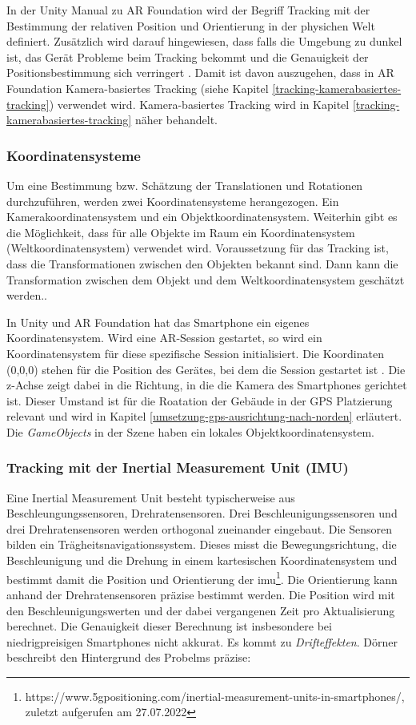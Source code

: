 In der Unity Manual zu AR Foundation wird der Begriff Tracking mit der Bestimmung der relativen Position und Orientierung in der physichen Welt definiert. Zusätzlich wird darauf hingewiesen, dass falls die Umgebung zu dunkel ist, das Gerät Probleme beim Tracking bekommt und die Genauigkeit der Positionsbestimmung sich verringert \cite{UnityARFoundation}. Damit ist davon auszugehen, dass in AR Foundation Kamera-basiertes Tracking (siehe Kapitel \ref*{tracking-kamerabasiertes-tracking}) verwendet wird. Kamera-basiertes Tracking wird in Kapitel \ref*{tracking-kamerabasiertes-tracking} näher behandelt.

\subsubsection{Koordinatensysteme}
\label{tracking-koordinatensysteme}
Um eine Bestimmung bzw. Schätzung der Translationen und Rotationen durchzuführen, werden zwei Koordinatensysteme herangezogen. Ein Kamerakoordinatensystem und ein Objektkoordinatensystem. Weiterhin gibt es die Möglichkeit, dass für alle Objekte im Raum ein Koordinatensystem (Weltkoordinatensystem) verwendet wird. Voraussetzung für das Tracking ist, dass die Transformationen zwischen den Objekten bekannt sind. Dann kann die Transformation zwischen dem Objekt und dem Weltkoordinatensystem geschätzt werden.\cite*[Dörner (2019) S.124f.,][]{doerner}.

In Unity und AR Foundation hat das Smartphone ein eigenes Koordinatensystem. Wird eine AR-Session gestartet, so wird ein Koordinatensystem für diese spezifische Session initialisiert. Die Koordinaten (0,0,0) stehen für die Position des Gerätes, bei dem die Session gestartet ist \cite{UnityARFoundation}. Die z-Achse zeigt dabei in die Richtung, in die die Kamera des Smartphones gerichtet ist. Dieser Umstand ist für die Roatation der Gebäude in der GPS Platzierung relevant und wird in Kapitel \ref*{umsetzung-gps-ausrichtung-nach-norden} erläutert. Die \textit{GameObjects} in der Szene haben ein lokales Objektkoordinatensystem.

\subsubsection{Tracking mit der Inertial Measurement Unit (IMU)}
\label{tracking-imu}
Eine Inertial Measurement Unit besteht typischerweise aus Beschleungungssensoren, Drehratensensoren. Drei Beschleunigungssensoren und drei Drehratensensoren werden orthogonal zueinander eingebaut. Die Sensoren bilden ein Trägheitsnavigationssystem. Dieses misst die Bewegungsrichtung, die Beschleunigung und die Drehung in einem kartesischen Koordinatensystem und bestimmt damit die Position und Orientierung der \acrshort{imu}\footnote{https://www.5gpositioning.com/inertial-measurement-units-in-smartphones/, zuletzt aufgerufen am 27.07.2022}. Die Orientierung kann anhand der Drehratensensoren präzise bestimmt werden. Die Position wird mit den Beschleunigungswerten und der dabei vergangenen Zeit pro Aktualisierung berechnet. Die Genauigkeit dieser Berechnung ist insbesondere bei niedrigpreisigen Smartphones nicht akkurat. Es kommt zu \textit{Drifteffekten}.
Dörner beschreibt den Hintergrund des Probelms präzise: 

